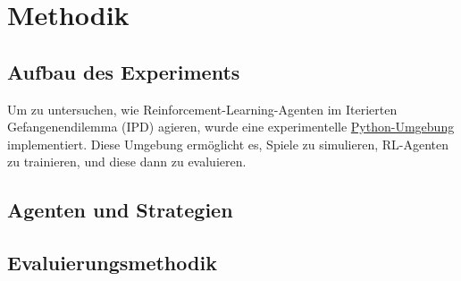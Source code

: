 \chapter{Methodik}
\section{Aufbau des Experiments}
Um zu untersuchen, wie Reinforcement-Learning-Agenten im Iterierten 
Gefangenendilemma (IPD) agieren, wurde eine experimentelle 
\href{https://github.com/Jonah-gr/Reinforcement-Learning-IPD}{Python-Umgebung} implementiert. 
Diese Umgebung ermöglicht es, Spiele zu simulieren, RL-Agenten zu trainieren, und diese dann zu evaluieren.
\section{Agenten und Strategien}
\section{Evaluierungsmethodik}